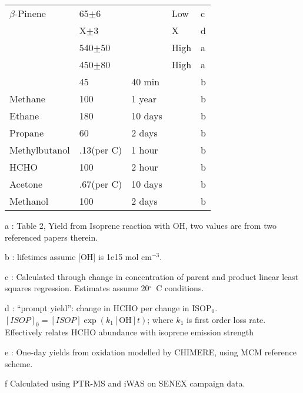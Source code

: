 \begin{table}
\begin{threeparttable}
\begin{tabular}{  l  l  l  l  l  }
	$\beta$-Pinene    & 65$\pm$6        &        & Low                & c      \\ 
      			          & X$\pm$3         &        & X                  & d      \\ 
      			          & 540$\pm$50      &        & High               & a     \\ 
      			          & 450$\pm$80      &        & High               & a      \\ 
      			          & 45              & 40 min &              & b      \\ %
	Methane 	      & 100             & 1 year  &             & b     \\ 
	Ethane            & 180             & 10 days &             & b     \\ 
	Propane           & 60              & 2 days  &             & b     \\ 
	Methylbutanol    & .13(per C)    & 1 hour  &             & b     \\ 
	HCHO             & 100             & 2 hour  &             & b     \\ 
	Acetone           & .67(per C)      & 10 days &             & b     \\ 
	Methanol          & 100             & 2 days  &             & b     \\ %
    	\bottomrule
    \end{tabular}
    \begin{tablenotes} %
      \item a \citet{AtkinsonArey2003}: Table 2, Yield from Isoprene reaction with OH, two values are from two referenced papers therein.
      \item b \citet{Palmer2003}: lifetimes assume [OH] is 1e15 mol cm$^{-3}$.
      \item c \citep{Lee2006}: Calculated through change in concentration of parent and product linear least squares regression.
        Estimates assume 20$^\circ$~C conditions.
  	  \item d \citet{Wolfe2016}: ``prompt yield'': change in HCHO per change in ISOP$_0$.
  	    $[ISOP]_0=[ISOP]\exp(k_1[\mathrm{OH}]t)$; where $k_1$ is first order loss rate.
  	    Effectively relates HCHO abundance with isoprene emission strength
      \item e \citet{Dufour2009}: One-day yields from oxidation modelled by CHIMERE, using MCM reference scheme.
      \item f Calculated using PTR-MS and iWAS on SENEX campaign data.
    \end{tablenotes}
    \label{ch_isop:tab:VOCLiteratureYields}
  \end{threeparttable} \end{table}

